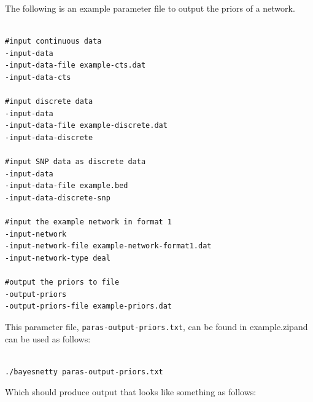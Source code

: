 \documentclass[a4paper,12pt]{article}
\newcommand{\code}[1]{{\footnotesize{{\tt #1}}}}
\begin{document}
The following is an example parameter file to output the priors of a network. 
\vspace{0.35cm} \begin{lstlisting}

#input continuous data
-input-data
-input-data-file example-cts.dat
-input-data-cts

#input discrete data
-input-data
-input-data-file example-discrete.dat
-input-data-discrete

#input SNP data as discrete data
-input-data
-input-data-file example.bed
-input-data-discrete-snp

#input the example network in format 1
-input-network
-input-network-file example-network-format1.dat
-input-network-type deal

#output the priors to file
-output-priors
-output-priors-file example-priors.dat

\end{lstlisting} \vspace{0.35cm}
This parameter file, \code{paras-output-priors.txt}, can be found in example.zipand can be used as follows: 
\vspace{0.35cm} \begin{lstlisting}

./bayesnetty paras-output-priors.txt

\end{lstlisting} \vspace{0.35cm}
Which should produce output that looks like something as follows: 
\end{document}
